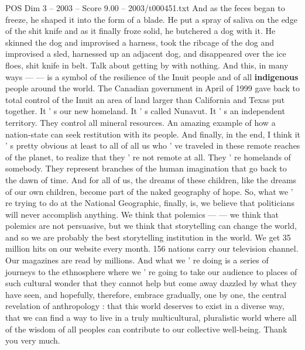 \begin{textsample}{POS Dim 3 – 2003 – Score 9.00 – 2003/t000451.txt}
And as the feces began to freeze, he shaped it into the form of a blade.
He put a spray of saliva on the edge of the shit knife and as it finally froze solid, he butchered a dog with it.
He skinned the dog and improvised a harness, took the ribcage of the dog and improvised a sled, harnessed up an adjacent dog, and disappeared over the ice floes, shit knife in belt.
Talk about getting by with nothing.
And this, in many ways — — is a symbol of the resilience of the Inuit people and of all \textbf{indigenous} people around the world.
The Canadian government in April of 1999 gave back to total control of the Inuit an area of land larger than California and Texas put together.
It ' s our new homeland.
It ' s called Nunavut.
It ' s an independent territory.
They control all mineral resources.
An amazing example of how a nation-state can seek restitution with its people.
And finally, in the end, I think it ' s pretty obvious at least to all of all us who ' ve traveled in these remote reaches of the planet, to realize that they ' re not remote at all.
They ' re homelands of somebody.
They represent branches of the human imagination that go back to the dawn of time.
And for all of us, the dreams of these children, like the dreams of our own children, become part of the naked geography of hope.
So, what we ' re trying to do at the National Geographic, finally, is, we believe that politicians will never accomplish anything.
We think that polemics — — we think that polemics are not persuasive, but we think that storytelling can change the world, and so we are probably the best storytelling institution in the world.
We get 35 million hits on our website every month. 156 nations carry our television channel.
Our magazines are read by millions.
And what we ' re doing is a series of journeys to the ethnosphere where we ' re going to take our audience to places of such cultural wonder that they cannot help but come away dazzled by what they have seen, and hopefully, therefore, embrace gradually, one by one, the central revelation of anthropology : that this world deserves to exist in a diverse way, that we can find a way to live in a truly multicultural, pluralistic world where all of the wisdom of all peoples can contribute to our collective well-being.
Thank you very much.

\end{textsample}
